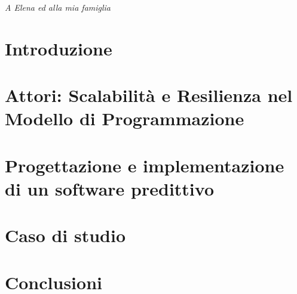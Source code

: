 \documentclass[a4paper, twoside]{book}
\begin{document}
    

    \thispagestyle{empty}
    \cleardoublepage

    \thispagestyle{empty}
    \null{}
        \begin{flushright}
            \textit{A Elena ed alla mia famiglia}
        \end{flushright}
    \null

    

    \tableofcontents
    \listoffigures

    \chapter{Introduzione}
    

    \chapter[Programmazione ad Attori]{Attori: Scalabilità e Resilienza nel Modello di Programmazione}
    

    \chapter[Pipeline predittiva]{Progettazione e implementazione di un software predittivo}
    

    \chapter[Caso di studio]{Caso di studio}
    

    \chapter[Conclusioni]{Conclusioni}
    

    \newpage
    \printbibliography
\end{document}
